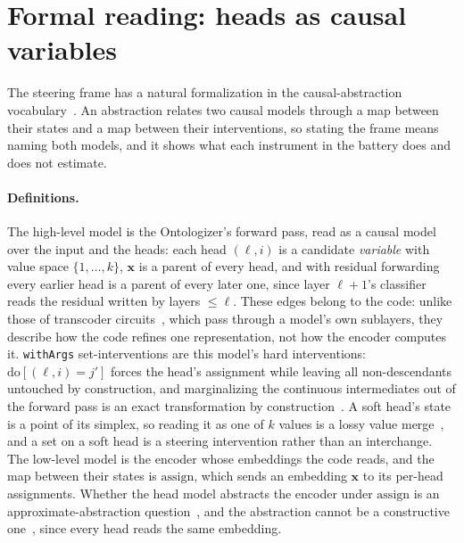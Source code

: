 \section{Formal reading: heads as causal variables}
\label{sec:formal}

The steering frame has a natural formalization in the causal-abstraction
vocabulary~\cite{rubenstein2017,beckers2019,geiger2021,geiger2025}. An
abstraction relates two causal models through a map between their states
and a map between their interventions, so stating the frame means naming
both models, and it shows what each instrument in the battery does and
does not estimate.

\paragraph{Definitions.}
The high-level model is the Ontologizer's forward pass, read as a causal
model over the input and the heads: each head $(\ell,i)$ is a candidate
\emph{variable} with value space $\{1,\dots,k\}$, $\mathbf{x}$ is a
parent of every head, and with residual forwarding every earlier head is
a parent of every later one, since layer $\ell{+}1$'s classifier reads the
residual written by layers $\le \ell$. These edges belong to the code:
unlike those of transcoder circuits~\cite{dunefsky2024}, which pass
through a model's own sublayers, they describe how the code refines one
representation, not how the encoder computes it. \texttt{withArgs}
set-interventions are this model's hard interventions:
$\mathrm{do}[(\ell,i){=}j']$ forces the head's assignment while leaving all
non-descendants untouched by construction, and marginalizing the
continuous intermediates out of the forward pass is an exact
transformation by construction~\cite[Thm.~10]{rubenstein2017}. A soft
head's state is a point of its simplex, so reading it as one of $k$ values
is a lossy value merge~\cite{geiger2025}, and a set on a soft head is a
steering intervention rather than an interchange. The low-level model is
the encoder whose embeddings the code reads, and the map between their
states is $\mathrm{assign}$, which sends an embedding $\mathbf{x}$ to its
per-head assignments. Whether the head model abstracts the encoder under
$\mathrm{assign}$ is an approximate-abstraction
question~\cite[Def.~41]{geiger2025}, and the abstraction cannot be a
constructive one~\cite{beckers2019}, since every head reads the same
embedding.

